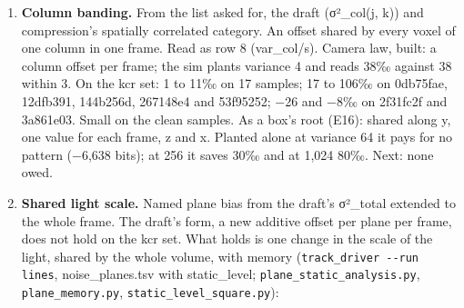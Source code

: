 \begin{enumerate}
\item \textbf{Column banding.} From the list asked for, the draft (σ²\_\allowbreak{}col(j, k)) and compression's spatially correlated category. An offset shared by every voxel of one column in one frame. Read as row 8 (var\_\allowbreak{}col/s). Camera law, built: a column offset per frame; the sim plants variance 4 and reads 38‰ against 38 within 3. On the kcr set: 1 to 11‰ on 17 samples; 17 to 106‰ on 0db75fae, 12dfb391, 144b256d, 267148e4 and 53f95252; −26 and −8‰ on 2f31fc2f and 3a861e03. Small on the clean samples. As a box's root (E16): shared along y, one value for each frame, z and x. Planted alone at variance 64 it pays for no pattern (−6,638 bits); at 256 it saves 30‰ and at 1,024 80‰. Next: none owed.
\item \textbf{Shared light scale.} Named plane bias from the draft's σ²\_\allowbreak{}total extended to the whole frame. The draft's form, a new additive offset per plane per frame, does not hold on the kcr set. What holds is one change in the scale of the light, shared by the whole volume, with memory (\texttt{track\_\allowbreak{}driver -\allowbreak{}-\allowbreak{}run lines}, noise\_\allowbreak{}planes.tsv with static\_\allowbreak{}level; \texttt{plane\_\allowbreak{}static\_\allowbreak{}analysis.\allowbreak{}py}, \texttt{plane\_\allowbreak{}memory.\allowbreak{}py}, \texttt{static\_\allowbreak{}level\_\allowbreak{}square.\allowbreak{}py}):


\end{enumerate}
